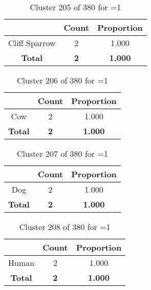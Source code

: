 \begin{table}[ht!]
\centering
\begin{tabular}{|c|c|c|}
\hline
\bf \Spec{} &\bf Count &\bf Proportion\\ \hline \hline
Cliff Sparrow & 2 & 1.000\\ \hline
\hline
\bf Total & \bf 2 & \bf 1.000\\ \hline
\end{tabular}
\label{tab:cluster:205:1}
\caption{Cluster 205 of 380 for \minneigh{}=1}
\end{table}

\begin{table}[ht!]
\centering
\begin{tabular}{|c|c|c|}
\hline
\bf \Spec{} &\bf Count &\bf Proportion\\ \hline \hline
Cow & 2 & 1.000\\ \hline
\hline
\bf Total & \bf 2 & \bf 1.000\\ \hline
\end{tabular}
\label{tab:cluster:206:1}
\caption{Cluster 206 of 380 for \minneigh{}=1}
\end{table}

\begin{table}[ht!]
\centering
\begin{tabular}{|c|c|c|}
\hline
\bf \Spec{} &\bf Count &\bf Proportion\\ \hline \hline
Dog & 2 & 1.000\\ \hline
\hline
\bf Total & \bf 2 & \bf 1.000\\ \hline
\end{tabular}
\label{tab:cluster:207:1}
\caption{Cluster 207 of 380 for \minneigh{}=1}
\end{table}

\begin{table}[ht!]
\centering
\begin{tabular}{|c|c|c|}
\hline
\bf \Spec{} &\bf Count &\bf Proportion\\ \hline \hline
Human & 2 & 1.000\\ \hline
\hline
\bf Total & \bf 2 & \bf 1.000\\ \hline
\end{tabular}
\label{tab:cluster:208:1}
\caption{Cluster 208 of 380 for \minneigh{}=1}
\end{table}

